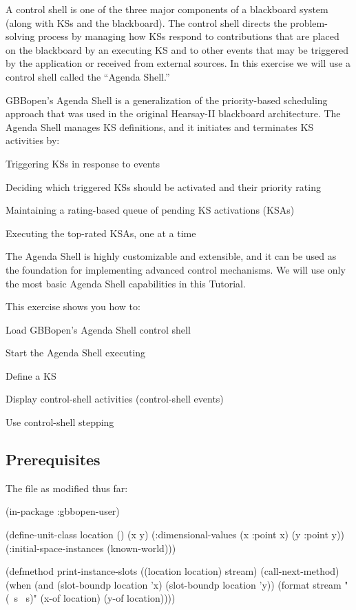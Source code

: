 \documentclass[10pt,twoside,english,pdftex]{article}
\begin{document}
A control shell is one of the three major components of a blackboard system
(along with KSs and the blackboard).  The control shell directs the
problem-solving process by managing how KSs respond to contributions that are
placed on the blackboard by an executing KS and to other events that may be
triggered by the application or received from external sources.  In this
exercise we will use a control shell called the ``Agenda Shell.''

GBBopen's Agenda Shell is a generalization of the priority-based scheduling
approach that was used in the original Hearsay-II blackboard architecture.
The Agenda Shell manages KS definitions, and it initiates and terminates KS
activities by:
%
\begin{tightitemize}
\item Triggering KSs in response to events
\item Deciding which triggered KSs should be activated and their priority
  rating
\item Maintaining a rating-based queue of pending KS activations (KSAs)
\item Executing the top-rated KSAs, one at a time
\end{tightitemize}

The Agenda Shell is highly customizable and extensible, and it can be used as
the foundation for implementing advanced control mechanisms.  We will use only
the most basic Agenda Shell capabilities in this Tutorial.

\fndocrule

This exercise shows you how to:
%
\begin{tightitemize}
\item Load GBBopen's Agenda Shell control shell
\item Start the Agenda Shell executing
\item Define a KS
\item Display control-shell activities (control-shell events)
\item Use control-shell stepping
\end{tightitemize}

\fndocrule

\subsection*{Prerequisites}

The  file as modified thus far:
%
\W\supp
\begin{example}
  (in-package :gbbopen-user)

  (define-unit-class location ()
    (x y)
    (:dimensional-values
      (x :point x)
      (y :point y))
    (:initial-space-instances (known-world)))

  (defmethod print-instance-slots ((location location) stream)
    (call-next-method)
    (when (and (slot-boundp location 'x)
               (slot-boundp location 'y))
      (format stream " (~s ~s)"
              (x-of location)
              (y-of location))))
\end{example}
\end{document}

